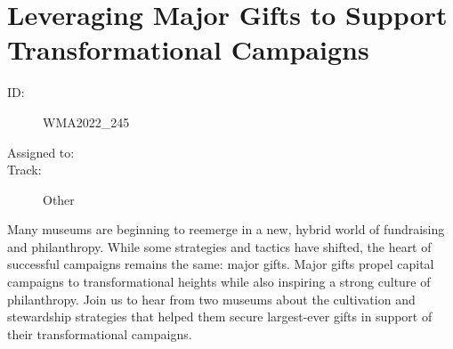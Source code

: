 \documentclass{report}
\begin{document}
              

              

              
        
          \newpage
          \section{ Leveraging Major Gifts to Support Transformational Campaigns }
            \begin{description}
              \item [ID:]
              WMA2022\_245

              \item [Assigned to:]
                \item [Track:]Other~
              \end{description}

              Many museums are beginning to reemerge in a new, hybrid world of fundraising and philanthropy. While some strategies and tactics have shifted, the heart of successful campaigns remains the same: major gifts. Major gifts propel capital campaigns to transformational heights while also inspiring a strong culture of philanthropy. Join us to hear from two museums about the cultivation and stewardship strategies that helped them secure largest-ever gifts in support of their transformational campaigns.
\end{document}
